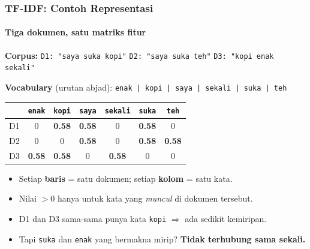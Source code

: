 \documentclass[t,aspectratio=169,xcolor=dvipsnames]{beamer}
\begin{document}
\begin{frame}
    \frametitle{TF-IDF: Contoh Representasi}
    \framesubtitle{Tiga dokumen, satu matriks fitur}
    \small
    \textbf{Corpus:}
    \quad \texttt{D1: "saya suka kopi"} \quad
    \texttt{D2: "saya suka teh"} \quad
    \texttt{D3: "kopi enak sekali"}
    \vspace{0.4em}

    \textbf{Vocabulary} (urutan abjad): \texttt{enak | kopi | saya | sekali | suka | teh}
    \vspace{0.4em}

    \begin{center}
    \small
    \setlength{\tabcolsep}{5pt}
    \begin{tabular}{l|cccccc}
        \toprule
         & \texttt{enak} & \texttt{kopi} & \texttt{saya} & \texttt{sekali} & \texttt{suka} & \texttt{teh} \\
        \midrule
        D1 & 0 & \textbf{0.58} & \textbf{0.58} & 0 & \textbf{0.58} & 0 \\
        D2 & 0 & 0 & \textbf{0.58} & 0 & \textbf{0.58} & \textbf{0.58} \\
        D3 & \textbf{0.58} & \textbf{0.58} & 0 & \textbf{0.58} & 0 & 0 \\
        \bottomrule
    \end{tabular}
    \end{center}
    \vspace{0.3em}
    \begin{itemize}
        \item Setiap \textbf{baris} = satu dokumen; setiap \textbf{kolom} = satu kata.
        \item Nilai $> 0$ hanya untuk kata yang \textit{muncul} di dokumen tersebut.
        \item D1 dan D3 sama-sama punya kata \texttt{kopi} $\Rightarrow$ ada sedikit kemiripan.
        \item Tapi \texttt{suka} dan \texttt{enak} yang bermakna mirip? \textbf{Tidak terhubung sama sekali.}
    \end{itemize}
\end{frame}
\end{document}
